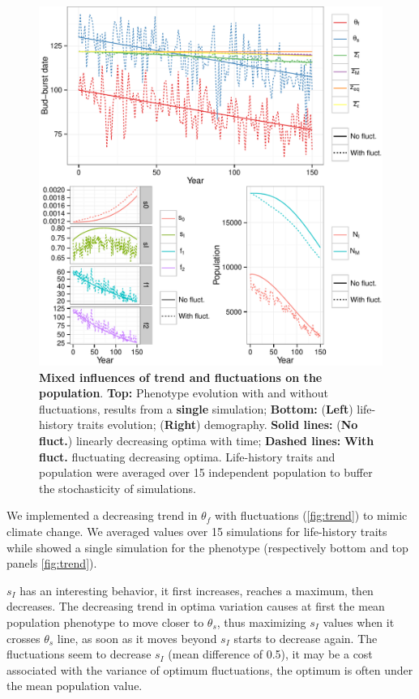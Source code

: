 \begin{figure}[ht!]
	\centering
	\includegraphics[scale=1]{Figures/Trend.pdf}
	\caption{\textbf{Mixed influences of trend and fluctuations on the population}. \textbf{Top:} Phenotype evolution with and without fluctuations, results from a \textbf{single} simulation; \textbf{Bottom:} (\textbf{Left}) life-history traits evolution; (\textbf{Right}) demography. \textbf{Solid lines:} (\textbf{No fluct.}) linearly decreasing optima with time; \textbf{Dashed lines:} \textbf{With fluct.} fluctuating decreasing optima. Life-history traits and population were averaged over 15 independent population to buffer the stochasticity of simulations.}
	\label{fig:trend}
\end{figure}

We implemented a decreasing trend in $\theta_f$ with fluctuations (\autoref{fig:trend}) to mimic climate change.
We averaged values over 15 simulations for life-history traits while showed a single simulation for the phenotype (respectively bottom and top panels \autoref{fig:trend}).

$s_I$ has an interesting behavior, it first increases, reaches a maximum, then decreases. The decreasing trend in optima variation causes at first the mean population phenotype to move closer to $\theta_s$, thus maximizing $s_I$ values when it crosses $\theta_s$ line, as soon as it moves beyond $s_I$ starts to decrease again. The fluctuations seem to decrease $s_I$ (mean difference of 0.5), it may be a cost associated with the variance of optimum fluctuations, the optimum is often under the mean population value.

